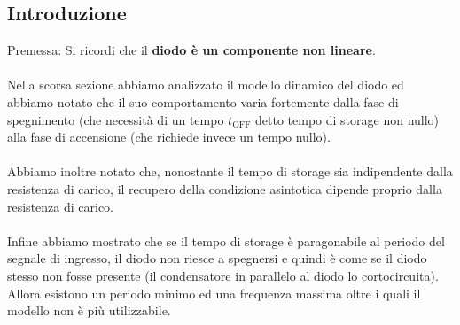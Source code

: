 \documentclass[../main.tex]{subfiles}
\begin{document}
	\subsection{Introduzione}
	Premessa: Si ricordi che il \textbf{diodo è un componente non lineare}.\\\\
	Nella scorsa sezione abbiamo analizzato il modello dinamico del diodo ed abbiamo notato che il suo comportamento varia fortemente dalla fase di spegnimento (che necessità di un tempo $t_{\text{OFF}}$ detto tempo di storage non nullo) alla fase di accensione (che richiede invece un tempo nullo).\\\\
	Abbiamo inoltre notato che, nonostante il tempo di storage sia indipendente dalla resistenza di carico, il recupero della condizione asintotica dipende proprio dalla resistenza di carico.\\\\
	Infine abbiamo mostrato che se il tempo di storage è paragonabile al periodo del segnale di ingresso, il diodo non riesce a spegnersi e quindi è come se il diodo stesso non fosse presente (il condensatore in parallelo al diodo lo cortocircuita). \\
	Allora esistono un periodo minimo ed una frequenza massima oltre i quali il modello non è più utilizzabile.
\end{document}
